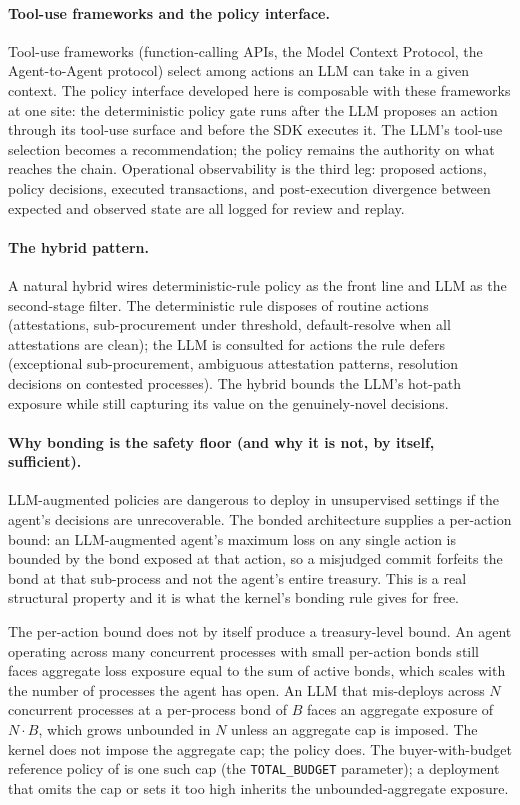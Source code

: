 \documentclass[11pt,a4paper]{article}
\theoremstyle{definition}
\theoremstyle{remark}
\begin{document}
\paragraph{Tool-use frameworks and the policy interface.}
Tool-use frameworks (function-calling APIs, the Model Context
Protocol, the Agent-to-Agent protocol) select among actions an
LLM can take in a given context. The policy interface developed
here is composable with these frameworks at one site: the
deterministic policy gate runs after the LLM proposes an action
through its tool-use surface and before the SDK executes it. The
LLM's tool-use selection becomes a recommendation; the policy
remains the authority on what reaches the chain. Operational
observability \citep{dong2024agentops} is the third leg:
proposed actions, policy decisions, executed transactions, and
post-execution divergence between expected and observed state are
all logged for review and replay.

\paragraph{The hybrid pattern.}
A natural hybrid wires deterministic-rule policy as the front line
and LLM as the second-stage filter. The deterministic rule disposes
of routine actions (attestations, sub-procurement under threshold,
default-resolve when all attestations are clean); the LLM is consulted
for actions the rule defers (exceptional sub-procurement, ambiguous
attestation patterns, resolution decisions on contested processes).
The hybrid bounds the LLM's hot-path exposure while still capturing
its value on the genuinely-novel decisions.

\paragraph{Why bonding is the safety floor (and why it is not, by itself, sufficient).}
LLM-augmented policies are dangerous to deploy in unsupervised
settings if the agent's decisions are unrecoverable. The bonded
architecture supplies a per-action bound: an LLM-augmented agent's
maximum loss on any single action is bounded by the bond exposed
at that action, so a misjudged commit forfeits the bond at that
sub-process and not the agent's entire treasury. This is a real
structural property and it is what the kernel's bonding rule
gives for free.

The per-action bound does not by itself produce a treasury-level
bound. An agent operating across many concurrent processes with
small per-action bonds still faces aggregate loss exposure equal
to the sum of active bonds, which scales with the number of
processes the agent has open. An LLM that mis-deploys across
$N$ concurrent processes at a per-process bond of $B$ faces an
aggregate exposure of $N \cdot B$, which grows unbounded in $N$
unless an aggregate cap is imposed. The kernel does not impose
the aggregate cap; the policy does. The buyer-with-budget
reference policy of  is one such cap (the
\texttt{TOTAL\_BUDGET} parameter); a deployment that omits the
cap or sets it too high inherits the unbounded-aggregate exposure.
\end{document}
